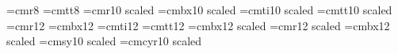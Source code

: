 

   











 
\nopagenumbers

\font\small=cmr8
\font\smalltt=cmtt8
\font\medium=cmr10 scaled \magstephalf
\font\mediumbx=cmbx10 scaled \magstephalf
\font\mediumit=cmti10 scaled \magstephalf
\font\mediumtt=cmtt10 scaled \magstephalf
\font\large=cmr12
\font\largebx=cmbx12
\font\largeit=cmti12
\font\largett=cmtt12
\font\Largebx=cmbx12 scaled \magstephalf
\font\huge=cmr12 scaled 
\font\hugebx=cmbx12 scaled 
\font\mediumsy=cmsy10 scaled \magstephalf
\font\mediumcy=cmcyr10 scaled \magstephalf

